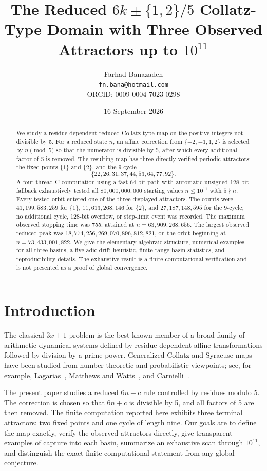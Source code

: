 \documentclass[11pt]{article}
\title{\textbf{The Reduced $6k\pm\{1,2\}/5$ Collatz-Type Domain with Three Observed Attractors up to $10^{11}$}}
\author{Farhad Banazadeh\\\texttt{fn.bana@hotmail.com}\\ORCID: 0009-0004-7023-0298}
\date{16 September 2026}
\begin{document}
\maketitle

\begin{abstract}
We study a residue-dependent reduced Collatz-type map on the positive integers not divisible by 5. For a reduced state $n$, an affine correction from $\{-2,-1,1,2\}$ is selected by $n\pmod 5$ so that the numerator is divisible by 5, after which every additional factor of 5 is removed. The resulting map has three directly verified periodic attractors: the fixed points $\{1\}$ and $\{2\}$, and the 9-cycle
\[
\{22,26,31,37,44,53,64,77,92\}.
\]
A four-thread C computation using a fast 64-bit path with automatic unsigned 128-bit fallback exhaustively tested all $80{,}000{,}000{,}000$ starting values $n\le 10^{11}$ with $5\nmid n$. Every tested orbit entered one of the three displayed attractors. The counts were $41{,}199{,}583{,}259$ for $\{1\}$, $11{,}613{,}268{,}146$ for $\{2\}$, and $27{,}187{,}148{,}595$ for the 9-cycle; no additional cycle, 128-bit overflow, or step-limit event was recorded. The maximum observed stopping time was 755, attained at $n=63{,}909{,}268{,}656$. The largest observed reduced peak was $18{,}774{,}256{,}269{,}070{,}896{,}812{,}821$, on the orbit beginning at $n=73{,}433{,}001{,}822$. We give the elementary algebraic structure, numerical examples for all three basins, a five-adic drift heuristic, finite-range basin statistics, and reproducibility details. The exhaustive result is a finite computational verification and is not presented as a proof of global convergence.
\end{abstract}

\section{Introduction}
The classical $3x+1$ problem is the best-known member of a broad family of arithmetic dynamical systems defined by residue-dependent affine transformations followed by division by a prime power. Generalized Collatz and Syracuse maps have been studied from number-theoretic and probabilistic viewpoints; see, for example, Lagarias~\cite{Lagarias1985}, Matthews and Watts~\cite{MatthewsWatts1985}, and Carnielli~\cite{Carnielli2015}.

The present paper studies a reduced $6n+c$ rule controlled by residues modulo 5. The correction is chosen so that $6n+c$ is divisible by 5, and all factors of 5 are then removed. The finite computation reported here exhibits three terminal attractors: two fixed points and one cycle of length nine. Our goals are to define the map exactly, verify the observed attractors directly, give transparent examples of capture into each basin, summarize an exhaustive scan through $10^{11}$, and distinguish the exact finite computational statement from any global conjecture.
\end{document}
